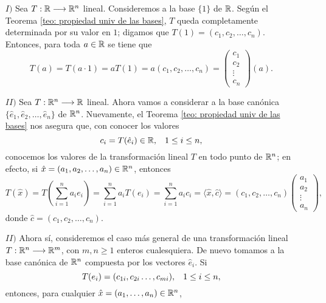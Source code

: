 \begin{itemize}
	\item[$I)$] Sea $T : \mathbb{R} \longrightarrow \mathbb{R}^{n}$ lineal.
	Consideremos a la base $\{ 1 \}$ de $\mathbb{R}$. Según el Teorema 
	\ref{teo: propiedad univ de las bases},
	$T$ queda completamente determinada por su valor en $1$;
	digamos que $T(1) = (c_{1}, c_{2}, \ldots , c_{n})$.
	Entonces, para toda $a \in \mathbb{R}$ se tiene que 
	\[
	T(a) = T(a \cdot 1) = a T(1) = a(c_{1}, c_{2}, \ldots, c_{n})
	= \begin{pmatrix}
	c_{1} \\ c_{2} \\ \vdots \\ c_{n} 
	\end{pmatrix}
	(a).
	\]
	
	\item[$II)$] Sea $T: \mathbb{R}^{n} \longrightarrow \mathbb{R}$ lineal. Ahora vamos
	a considerar a la base canónica 
	$\{ \hat{e}_{1}, \hat{e}_{2}, \ldots , \hat{e}_{n} \}$
	de $\mathbb{R}^{n}$. Nuevamente, el Teorema \ref{teo: propiedad univ de las bases}
	nos asegura que,
	con conocer los valores
	\begin{equation*}
		\label{eq: 0, 9 oct}
		c_{i} = T(\hat{e}_{i}) \in \mathbb{R}, \hspace{0.3cm} 1 \leq i \leq n,
	\end{equation*}
	conocemos los valores de la transformación lineal $T$ en todo 
	punto de $\mathbb{R}^{n}$; en efecto,
	si $\hat{x} = (a_{1}, a_{2}, \ldots , a_{n}) \in \mathbb{R}^{n}$, entonces
	\[
	T(\hat{x}) = T\left( \sum_{i=1}^{n} a_{i}e_{i} \right)
	= \sum_{i=1}^{n} a_{i} T(e_{i}) = 
	\sum_{i=1}^{n} a_{i}c_{i} = \langle \hat{x}, \hat{c} \rangle
	= (c_{1}, c_{2}, \ldots, c_{n}) \begin{pmatrix}
	a_{1} \\ a_{2} \\ \vdots \\ a_{n}
	\end{pmatrix},
	\]
	donde $\hat{c} = (c_{1}, c_{2}, \ldots ,c_{n})$.
	\item[$II)$] Ahora sí, consideremos el caso más general de 
	una transformación lineal $T: \mathbb{R}^{n} \longrightarrow \mathbb{R}^{m}$,
	con $m, n \geq 1$ enteros cualesquiera.
	De nuevo tomamos a la base canónica de $\mathbb{R}^{n}$ compuesta
	por los vectores $\hat{e}_{i}$. Si 
	\[
	T(e_{i}) = (c_{1i}, c_{2i} \ldots , c_{mi}),
	\hspace{0.3cm} 1 \leq i \leq n,
	\]
	entonces,
	para cualquier $\hat{x} = (a_{1}, \ldots , a_{n}) \in \mathbb{R}^{n}$,
	\begin{align*}

\end{align*}
\end{itemize}
